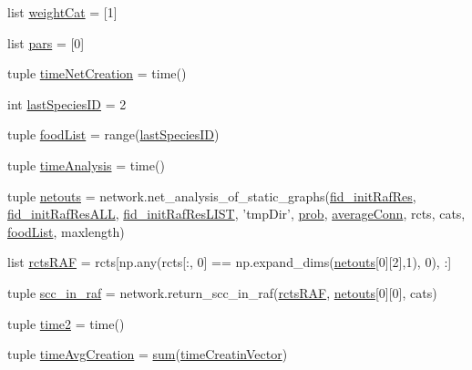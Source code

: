\begin{DoxyCompactItemize}
\item 
list \hyperlink{a00159_a67cf979bfd8cf26867524a1a788a5e63}{weight\+Cat} = \mbox{[}1\mbox{]}
\item 
list \hyperlink{a00159_a516f339905d01b02a4e16181f2fde4be}{pars} = \mbox{[}0\mbox{]}
\item 
tuple \hyperlink{a00159_a2f85d448268dd44ad47f66b65bfa45b6}{time\+Net\+Creation} = time()
\item 
int \hyperlink{a00159_a1aa5d59ebf308accb3c960b5fd90a445}{last\+Species\+I\+D} = 2
\item 
tuple \hyperlink{a00159_a96850fa3d62df1176a8d7a5b988f4a32}{food\+List} = range(\hyperlink{a00159_a1aa5d59ebf308accb3c960b5fd90a445}{last\+Species\+I\+D})
\item 
tuple \hyperlink{a00159_ace5bda70ff24e6a220afb4438240003a}{time\+Analysis} = time()
\item 
tuple \hyperlink{a00159_af42f57da8ba80463f419efaf0f6f2c33}{netouts} = network.\+net\+\_\+analysis\+\_\+of\+\_\+static\+\_\+graphs(\hyperlink{a00159_aa47d62b7ce95f5c4e730d081209770c2}{fid\+\_\+init\+Raf\+Res}, \hyperlink{a00159_afcacf140d9efed55635e8dcd084db870}{fid\+\_\+init\+Raf\+Res\+A\+L\+L}, \hyperlink{a00159_abca13a03834449d5629252329999f1a3}{fid\+\_\+init\+Raf\+Res\+L\+I\+S\+T}, 'tmp\+Dir', \hyperlink{a00159_aad2c05e3d2146196ed236911dd796f6e}{prob}, \hyperlink{a00159_a0d59133b2bb42e7aa26a3dba3a2a9a70}{average\+Conn}, rcts, cats, \hyperlink{a00159_a96850fa3d62df1176a8d7a5b988f4a32}{food\+List}, maxlength)
\item 
list \hyperlink{a00159_aeb909c76682b690cc5ab6aca5ac37c4d}{rcts\+R\+A\+F} = rcts\mbox{[}np.\+any(rcts\mbox{[}\+:, 0\mbox{]} == np.\+expand\+\_\+dims(\hyperlink{a00159_af42f57da8ba80463f419efaf0f6f2c33}{netouts}\mbox{[}0\mbox{]}\mbox{[}2\mbox{]},1), 0), \+:\mbox{]}
\item 
tuple \hyperlink{a00159_ac864e2a75b705766c1d81f68897f52c0}{scc\+\_\+in\+\_\+raf} = network.\+return\+\_\+scc\+\_\+in\+\_\+raf(\hyperlink{a00159_aeb909c76682b690cc5ab6aca5ac37c4d}{rcts\+R\+A\+F}, \hyperlink{a00159_af42f57da8ba80463f419efaf0f6f2c33}{netouts}\mbox{[}0\mbox{]}\mbox{[}0\mbox{]}, cats)
\item 
tuple \hyperlink{a00159_a44666efa43bfc08ab8305c8d325f7456}{time2} = time()
\item 
tuple \hyperlink{a00159_a4cd61f10a5a0a8d80608e71a1fc2009c}{time\+Avg\+Creation} = \hyperlink{a00106_a59a869fb2b28d56dacd91c09e1dffc8d}{sum}(\hyperlink{a00159_a0527a0989312340a402661aebc675d30}{time\+Creatin\+Vector})
\item 

\end{DoxyCompactItemize}
